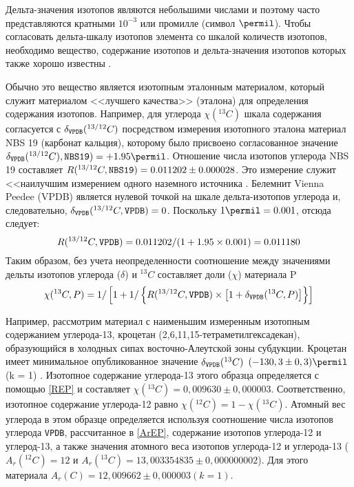 \documentclass[a5paper,openany]{book}
\begin{document}
Дельта-значения изотопов являются небольшими числами и поэтому часто представляются кратными $10^{-3}$ или промилле (символ $\permil$). 
Чтобы согласовать дельта-шкалу изотопов элемента со шкалой количеств изотопов, необходимо вещество,
содержание изотопов и дельта-значения изотопов которых также хорошо известны .

Обычно это вещество является изотопным эталонным материалом, который служит материалом <<лучшего качества>> (эталона) для определения содержания изотопов. Например, для углерода $\chi(^{13}C)$
шкала содержания согласуется с  $\delta_{\tt VPDB}(^{13/12}C)$ посредством измерения изотопного эталона
материал NBS 19 (карбонат кальция), которому было присвоено согласованное значение $\delta_{\tt VPDB}(^{13/12}C), {\tt NBS 19}) = +1.95 \permil$. 
Отношение числа изотопов углерода NBS 19 составляет
$R(^{13/12}C, {\tt NBS 19}) = 0.011 202 \pm 0.000 028$. 
Это измерение служит <<наилучшим измерением одного наземного источника \cite{IUPAC2016}. Белемнит Vienna Peedee (VPDB) является нулевой точкой на шкале дельта-изотопов углерода и, следовательно,
$  \delta_{\tt VPDB}(^{13/12}C, {\tt VPDB}) = 0$. Поскольку $1 \permil = 0.001$, отсюда следует: 
\begin{equation} %
	R(^{13/12}C, {\tt VPDB}) = 0.011 202/(1 + 1.95 \times 0.001) = 0.011 180
	\end{equation}
Таким образом, без учета неопределенности соотношение между значениями дельты изотопов углерода ($\delta$) и $^{13}C$ составляет доли ($\chi$) материала P
\begin{equation} %
	\chi(^{13}C, P) = 1/ \left[  1 + 1/ \left\lbrace  R (^{13/12}C, {\tt VPDB} ) \times \left[  1 + \delta_{\tt VPDB}(^{13}C, P) \right]  \right\rbrace \right]  
\end{equation}

Например, рассмотрим материал с наименьшим измеренным изотопным содержанием углерода-13, кроцетан 
(2,6,11,15-тетраметилгексадекан), образующийся в холодных сипах восточно-Алеутской зоны субдукции. 
Кроцетан имеет минимальное опубликованное значение $\delta_{\tt VPDB}(^{13}C)$ $(- 130,3 \pm 0,3)\permil$(k = 1) \cite{Crocetane}. Изотопное содержание углерода-13 этого образца определяется с помощью \eqref{REP} и составляет $\chi(^{13}C) = 0,009 630 \pm 0,000 003$. Соответственно, изотопное содержание углерода-12 равно $\chi(^{12}C) = 1 - \chi(^{13}C)$. Атомный вес углерода в этом образце определяется
используя соотношение числа изотопов углерода {\tt VPDB}, рассчитанное в \eqref{ArEP}, содержание изотопов углерода-12
и углерод-13, а также значения атомного веса изотопов углерода-12 и углерода-13 ($A_r(^{12}C) = 12$ и
$A_r(^{13}C) = 13,003 354 835 \pm 0,000 000 002$). Для этого материала $A_r(C) = 12,009 662 \pm 0,000 003 (k = 1)$.
\end{document}
